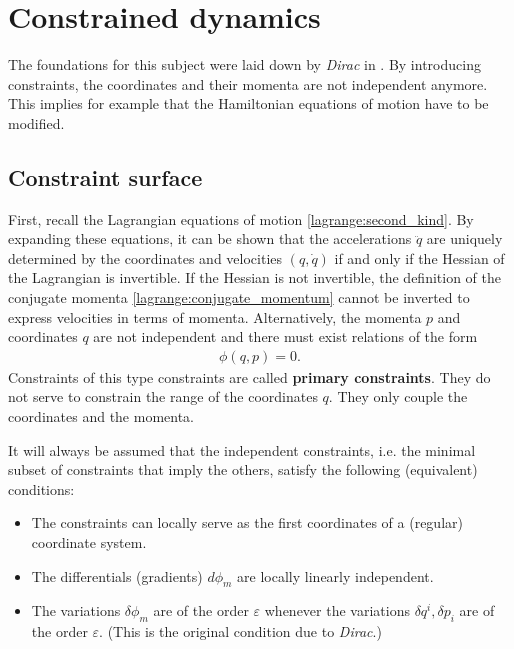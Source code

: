 \chapter{Constrained dynamics}\label{chapter:constrained_dynamics}

    The foundations for this subject were laid down by \textit{Dirac} in \cite{constrained}. By introducing constraints, the coordinates and their momenta are not independent anymore. This implies for example that the Hamiltonian equations of motion have to be modified.

\section{Constraint surface}

    First, recall the Lagrangian equations of motion \eqref{lagrange:second_kind}. By expanding these equations, it can be shown that the accelerations $\ddot{q}$ are uniquely determined by the coordinates and velocities $(q,\dot{q})$ if and only if the Hessian of the Lagrangian is invertible. If the Hessian is not invertible, the definition of the conjugate momenta \ref{lagrange:conjugate_momentum} cannot be inverted to express velocities in terms of momenta. Alternatively, the momenta $p$ and coordinates $q$ are not independent and there must exist relations of the form
    \begin{gather}
        \phi(q,p) = 0.
    \end{gather}
    Constraints of this type constraints are called \textbf{primary constraints}. They do not serve to constrain the range of the coordinates $q$. They only couple the coordinates and the momenta.

    \begin{axiom}
        It will always be assumed that the independent constraints, i.e. the minimal subset of constraints that imply the others, satisfy the following (equivalent) conditions:
        \begin{itemize}
            \item The constraints can locally serve as the first coordinates of a (regular) coordinate system.
            \item The differentials (gradients) $d\phi_m$ are locally linearly independent.
            \item The variations $\delta\phi_m$ are of the order $\varepsilon$ whenever the variations $\delta q^i,\delta p_i$ are of the order $\varepsilon$. (This is the original condition due to \textit{Dirac}.)
        \end{itemize}
    \end{axiom}


